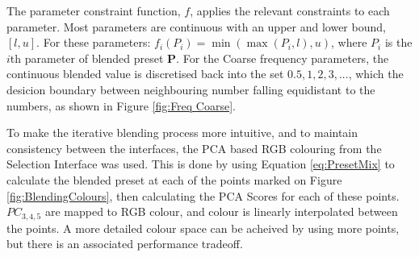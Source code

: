 \documentclass[11pt, oneside]{report}   	%
\renewcommand{\vec}[1]{\mathbf{#1}}
\begin{document}
The parameter constraint function, $f$, applies the relevant constraints to each parameter. Most parameters are continuous with an upper and lower bound, $[l, u]$. For these parameters: $f_i(P_i) = \min(\max(P_i, l), u)$, where $P_i$ is the $i$th parameter of blended preset $\vec{P}$. For the Coarse frequency parameters, the continuous blended value is discretised back into the set ${0.5, 1, 2, 3, ...}$, which the desicion boundary between neighbouring number falling equidistant to the numbers, as shown in Figure \ref{fig:Freq Coarse}.

To make the iterative blending process more intuitive, and to maintain consistency between the interfaces, the PCA based RGB colouring from the Selection Interface was used. This is done by using Equation \ref{eq:PresetMix} to calculate the blended preset at each of the points marked on Figure \ref{fig:BlendingColours}, then calculating the PCA Scores for each of these points. $PC_{3,4,5}$ are mapped to RGB colour, and colour is linearly interpolated between the points. A more detailed colour space can be acheived by using more points, but there is an associated performance tradeoff. 
\end{document}
